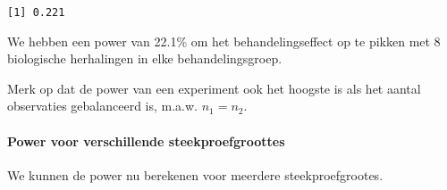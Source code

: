 \documentclass[
]{article}
\newenvironment{Shaded}{\begin{snugshade}}{\end{snugshade}}
\newcommand{\AttributeTok}[1]{\textcolor[rgb]{0.77,0.63,0.00}{#1}}
\newcommand{\ConstantTok}[1]{\textcolor[rgb]{0.00,0.00,0.00}{#1}}
\newcommand{\ControlFlowTok}[1]{\textcolor[rgb]{0.13,0.29,0.53}{\textbf{#1}}}
\newcommand{\DecValTok}[1]{\textcolor[rgb]{0.00,0.00,0.81}{#1}}
\newcommand{\FunctionTok}[1]{\textcolor[rgb]{0.00,0.00,0.00}{#1}}
\newcommand{\NormalTok}[1]{#1}
\newcommand{\OtherTok}[1]{\textcolor[rgb]{0.56,0.35,0.01}{#1}}
\newcommand{\SpecialCharTok}[1]{\textcolor[rgb]{0.00,0.00,0.00}{#1}}
\newcommand{\StringTok}[1]{\textcolor[rgb]{0.31,0.60,0.02}{#1}}
\begin{document}
\begin{verbatim}
[1] 0.221
\end{verbatim}

We hebben een power van 22.1\% om het behandelingseffect op te pikken
met 8 biologische herhalingen in elke behandelingsgroep.

Merk op dat de power van een experiment ook het hoogste is als het
aantal observaties gebalanceerd is, m.a.w. \(n_1=n_2\).

\hypertarget{power-voor-verschillende-steekproefgroottes}{%
\paragraph{Power voor verschillende
steekproefgroottes}\label{power-voor-verschillende-steekproefgroottes}}

We kunnen de power nu berekenen voor meerdere steekproefgrootes.

\begin{Shaded}
\end{Shaded}
\end{document}

